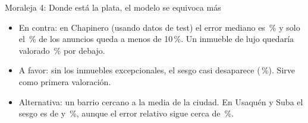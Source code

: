 \documentclass[aspectratio=169, 11pt]{beamer}
\begin{document}
\begin{frame}{Moraleja 4: Donde está la plata, el modelo se equivoca más}
  \small
  \begin{itemize}\setlength{\itemsep}{10pt}
    \item En contra: en Chapinero (usando datos de test) el error mediano es \mapeChap\,\% y solo el \dentroDiezChap\,\% de los anuncios queda a menos de 10\,\%. Un inmueble de lujo quedaría valorado \sesgoMessiRed\,\% por debajo.
    \item A favor: sin los inmuebles excepcionales, el sesgo casi desaparece (\sesgoRestoRed\,\%). Sirve como primera valoración.
    \item Alternativa: un barrio cercano a la media de la ciudad. En Usaquén y Suba el sesgo es de \sesgoUsaquen{} y \sesgoSuba\,\%, aunque el error relativo sigue cerca de \mapeUsaquen\,\%.
  \end{itemize}
\end{frame}
\end{document}
